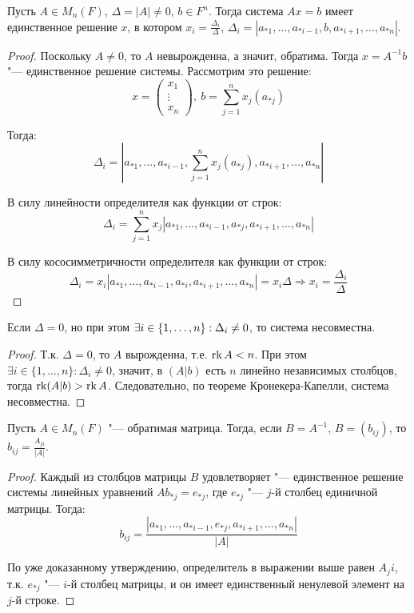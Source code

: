 \begin{theorem}
	Пусть $A \in M_n(F)$, $\Delta = |A| \ne 0$, $b \in F^n$. Тогда система $Ax = b$ имеет единственное решение $x$, в котором $x_i = \frac{\Delta_i}{\Delta}$, $\Delta_i = |a_{*1},\dots,a_{*i-1},b,a_{*i+1},\dots,a_{*n}|$.
\end{theorem}

\begin{proof}
	Поскольку $A \ne 0$, то $A$ невырожденна, а значит, обратима. Тогда $x = A^{-1}b$ "--- единственное решение системы. Рассмотрим это решение:
	\[x = \begin{pmatrix}x_1\\\vdots\\x_n\end{pmatrix},~b = \sum_{j = 1}^{n}x_j(a_{*j})\]
	
	Тогда:
	\[\Delta_i = \left|a_{*1},\dots,a_{*i-1},\sum_{j = 1}^{n}x_j(a_{*j}),a_{*i+1},\dots,a_{*n}\right|\]
	
	В силу линейности определителя как функции от строк:
	\[\Delta_i = \sum_{j = 1}^{n}x_j\left|a_{*1},\dots,a_{*i-1},a_{*j},a_{*i+1},\dots,a_{*n}\right|\]
	
	В силу кососимметричности определителя как функции от строк:
	\[\Delta_i = x_i\left|a_{*1},\dots,a_{*i-1},a_{*i},a_{*i+1},\dots,a_{*n}\right| = x_i\Delta \Rightarrow x_i = \frac{\Delta_i}{\Delta}\]
\end{proof}

\begin{proposition}
	Если $\Delta = 0$, но при этом $\exists i \in \{1, \dots, n\}: \Delta_i \hm{\ne} 0$, то система несовместна.
\end{proposition}

\begin{proof}
	Т.\:к. $\Delta = 0$, то $A$ вырожденна, т.\:е. $\operatorname{rk}{A} < n$. При этом $\exists i \in \{1, \dots, n\}: \Delta_i \ne 0$, значит, в $(A|b)$ есть $n$ линейно независимых столбцов, тогда $\operatorname{rk}(A|b) > \operatorname{rk}{A}$. Следовательно, по теореме Кронекера-Капелли, система несовместна.
\end{proof}

\begin{corollary}
	Пусть $A \in M_n(F)$ "--- обратимая матрица. Тогда, если $B = A^{-1}$, $B = (b_{ij})$, то $b_{ij} = \frac{A_{ji}}{|A|}$.
\end{corollary}

\begin{proof}
	Каждый из столбцов матрицы $B$ удовлетворяет "--- единственное решение системы линейных уравнений $Ab_{*j} = e_{*j}$, где $e_{*j}$ "--- $j$-й столбец единичной матрицы. Тогда:
	\[b_{ij} = \frac{\left|a_{*1}, \dots, a_{*i-1},e_{*j},a_{*i+1}, \dots, a_{*n}\right|}{|A|}\]
	
	По уже доказанному утверждению, определитель в выражении выше равен $A_ji$, т.\:к. $e_{*j}$ "--- $i$-й столбец матрицы, и он имеет единственный ненулевой элемент на $j$-й строке.
\end{proof}

